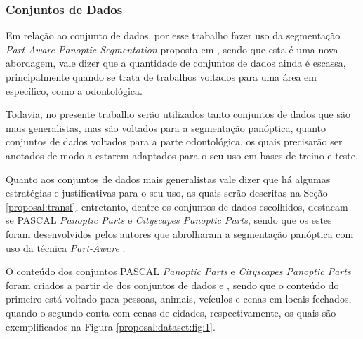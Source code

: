 \subsubsection{Conjuntos de Dados}
\label{proposal:dataset}
Em relação ao conjunto de dados, por esse trabalho fazer uso da segmentação \textit{Part-Aware Panoptic Segmentation} proposta em \cite{DeGeus2021}, sendo que esta é uma nova abordagem, vale dizer que a quantidade de conjuntos de dados ainda é escassa, principalmente quando se trata de trabalhos voltados para uma área em específico, como a odontológica.

Todavia, no presente trabalho serão utilizados tanto conjuntos de dados que são mais generalistas, mas são voltados para a segmentação panóptica, quanto conjuntos de dados voltados para a parte odontológica, os quais precisarão ser anotados de modo a estarem adaptados para o seu uso em bases de treino e teste.

Quanto aos conjuntos de dados mais generalistas vale dizer que há algumas estratégias e justificativas para o seu uso, as quais serão descritas na Seção \ref{proposal:transf}, entretanto, dentre os conjuntos de dados escolhidos, destacam-se PASCAL \textit{Panoptic Parts} e \textit{Cityscapes Panoptic Parts}, sendo que os estes foram desenvolvidos pelos autores que abrolharam a segmentação panóptica com uso da técnica \textit{Part-Aware} \cite{DeGeus2021}.

O conteúdo dos conjuntos PASCAL \textit{Panoptic Parts} e \textit{Cityscapes Panoptic Parts} foram criados a partir de dos conjuntos de dados \cite{everingham2010pascal} e \cite{Cordts2016}, sendo que o conteúdo do primeiro está voltado para pessoas, animais, veículos e cenas em locais fechados, quando o segundo conta com cenas de cidades, respectivamente, os quais são exemplificados na Figura \ref{proposal:dataset:fig:1}.

